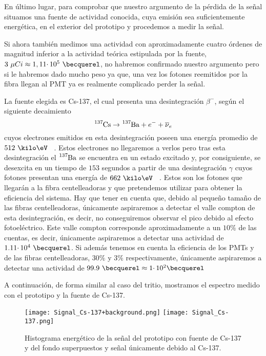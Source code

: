 En último lugar, para comprobar que nuestro argumento de la pérdida de la señal situamos una fuente de actividad conocida, cuya emisión sea suficientemente energética, en el exterior del prototipo y procedemos a medir la señal. 

Si ahora también medimos una actividad con aproximadamente cuatro órdenes de magnitud inferior a la actividad teórica estipulada por la fuente, $3~\mu Ci \approx 1,11 \cdotp 10^{5}~\becquerel$, no habremos confirmado nuestro argumento pero si le habremos dado mucho peso ya que, una vez los fotones reemitidos por la fibra llegan al PMT ya es realmente complicado perder la señal. 

La fuente elegida es Cs-137, el cual presenta una desintegración $\beta^{-}$, según el siguiente decaimiento
\begin{equation}
\ce{^{137}Cs} \rightarrow \ce{^{137}Ba} + e^- + \overline{\nu}_e
\label{desintegracionbeta}
\end{equation}
cuyos electrones emitidos en esta desintegración poseen una energía promedio de $512~\kilo\eV$ ~\cite{Isotopos}. Estos electrones no llegaremos a verlos pero tras esta desintegración el $\ce{^{137}Ba}$ se encuentra en un estado excitado y, por consiguiente, se desexcita en un tiempo de $153$ segundos a partir de una desintegración $\gamma$ cuyos fotones presentan una energía de $662~\kilo\eV$ ~\cite{Isotopos}. Estos son los fotones que llegarán a la fibra centelleadoras y que pretendemos utilizar para obtener la eficiencia del sistema. Hay que tener en cuenta que, debido al pequeño tamaño de las fibras centelleadoras, únicamente aspiraremos a detectar el valle compton de esta desintegración, es decir, no conseguiremos observar el pico debido al efecto fotoeléctrico. Este valle compton corresponde aproximadamente a un $10\%$ de las cuentas, es decir, únicamente aspiraremos a detectar una actividad de $1.11 \cdotp 10^{4}~\becquerel$. Si además tenemos en cuenta la eficiencia de los PMTs y de las fibras centelleadoras, $30\%$ y $3\%$ respectivamente, únicamente aspiraremos a detectar una actividad de $99.9~\becquerel \approx 1 \cdotp 10^{2} \becquerel$

A continuación, de forma similar al caso del tritio, mostramos el espectro medido con el prototipo y la fuente de Cs-137.

\begin{figure}[htb]
\centering
{
\texttt{[image: Signal\_Cs-137+background.png]} 
}
{
\texttt{[image: Signal\_Cs-137.png]} 
}
\caption{Histograma energético de la señal del prototipo con fuente de Cs-137 y del fondo superpuestos y señal únicamente debido al Cs-137.\label{senalcesio}}
\end{figure}

